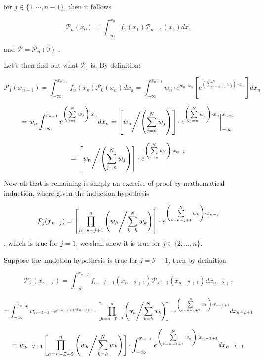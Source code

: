 \documentclass[fleqn]{article}
\begin{document}
for $j \in \{1, \cdots, n - 1\}$, then it follows

$$
\mathcal{P}_n(x_0) = \int_{-\infty}^{x_0} f_1(x_1)\mathcal{P}_{n - 1}(x_1) dx_1
$$

and $\mathcal{P} = \mathcal{P}_n(0)$
.

\clearpage

Let's then find out what $\mathcal{P}_1$ is. By definition:

$$
\mathcal{P}_1(x_{n - 1}) = \int_{-\infty}^{x_{n - 1}}f_{n}(x_{n}) \mathcal{P}_{0}(x_{n}) d x_{n}
= \int_{-\infty}^{x_{n - 1}} w_n \cdot e^{w_n \cdot x_n} \left[ e^{\left(\sum\limits_{j = n + 1}^N w_j\right) \cdot x_n} \right]d x_{n}
$$

$$
= w_n \int_{-\infty}^{x_{n - 1}} e^{\left(\sum\limits_{j = n}^N w_j\right) \cdot x_n} d x_{n}
= \left[w_n \middle/ \left(\sum\limits_{j = n}^N w_j\right)\right] \cdot e^{\left(\sum\limits_{j = n}^N w_j\right) \cdot x_n} \bigg\rvert_{-\infty}^{x_{n - 1}}
$$

$$
= \left[w_n \middle/ \left(\sum\limits_{j = n}^N w_j\right)\right] \cdot e^{\left(\sum\limits_{j = n}^N w_j\right) \cdot x_{n - 1}}
$$

Now all that is remaining is simply an exercise of proof by mathematical induction, where given the induction hypothesis

$$
\mathcal{P}_j(x_{n - j}) = \left[ \prod\limits_{h = n - j + 1}^{n} \left( w_h \middle/ {\sum\limits_{k = h}^N w_k} \right) \right] \cdot e^{\left(\sum\limits_{k = n - j + 1}^N w_k\right) \cdot x_{n - j}}
$$
, which is true for $j = 1$, we shall show it is true for $j \in \{2, \dots, n\}$.

Suppose the inudction hypothesis is true for $j = \mathcal{I} - 1$, then by definition

$$
\mathcal{P}_{\mathcal{I}}(x_{n - \mathcal{I}}) = \int_{-\infty}^{x_{n - \mathcal{I}}}f_{n - \mathcal{I} + 1}(x_{n - \mathcal{I} + 1}) \mathcal{P}_{\mathcal{I} - 1}(x_{n - \mathcal{I} + 1}) d x_{n - \mathcal{I} + 1}
$$

$$
= \int_{-\infty}^{x_{n - \mathcal{I}}}w_{n - \mathcal{I} + 1}\cdot e^{w_{n - \mathcal{I} + 1}\cdot x_{n - \mathcal{I} + 1}} \cdot
\left[ \prod\limits_{h = n - \mathcal{I} + 2}^{n} \left( w_h \middle/ {\sum\limits_{k = h}^N w_k} \right) \right] \cdot e^{\left(\sum\limits_{k = n - \mathcal{I} + 2}^N w_k\right) \cdot x_{n - \mathcal{I} + 1}} d x_{n - \mathcal{I} + 1}
$$

$$
= w_{n - \mathcal{I} + 1} \left[ \prod\limits_{h = n - \mathcal{I} + 2}^{n} \left( w_h \middle/ {\sum\limits_{k = h}^N w_k} \right) \right] \cdot \int_{-\infty}^{x_{n - \mathcal{I}}} e^{\left(\sum\limits_{k = n - \mathcal{I} + 1}^N w_k\right) \cdot x_{n - \mathcal{I} + 1}} d x_{n - \mathcal{I} + 1}
$$
\end{document}
